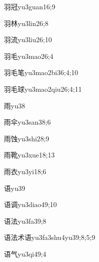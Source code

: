 \begin{verbete}{羽冠}{yu3guan1}{6;9}
\end{verbete}
\begin{verbete}{羽林}{yu3lin2}{6;8}
\end{verbete}
\begin{verbete}{羽流}{yu3liu2}{6;10}
\end{verbete}
\begin{verbete}{羽毛}{yu3mao2}{6;4}
\end{verbete}
\begin{verbete}{羽毛笔}{yu3mao2bi3}{6;4;10}
\end{verbete}
\begin{verbete}{羽毛球}{yu3mao2qiu2}{6;4;11}
\end{verbete}
\begin{verbete}{雨}{yu3}{8}
\end{verbete}
\begin{verbete}{雨伞}{yu3san3}{8;6}
\end{verbete}
\begin{verbete}{雨蚀}{yu3shi2}{8;9}
\end{verbete}
\begin{verbete}{雨靴}{yu3xue1}{8;13}
\end{verbete}
\begin{verbete}{雨衣}{yu3yi1}{8;6}
\end{verbete}
\begin{verbete}{语}{yu3}{9}
\end{verbete}
\begin{verbete}{语调}{yu3diao4}{9;10}
\end{verbete}
\begin{verbete}{语法}{yu3fa3}{9;8}
\end{verbete}
\begin{verbete}{语法术语}{yu3fa3shu4yu3}{9;8;5;9}
\end{verbete}
\begin{verbete}{语气}{yu3qi4}{9;4}
\end{verbete}
